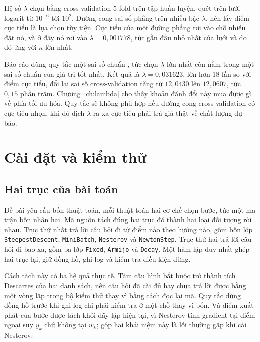 \documentclass[12pt, a4paper, oneside]{report}
\theoremstyle{definition}
\begin{document}
Hệ số $\lambda$ chọn bằng cross-validation $5$ fold trên tập huấn luyện, quét trên
lưới logarit từ $10^{-6}$ tới $10^{2}$. Đường cong sai số phẳng trên nhiều bậc
$\lambda$, nên lấy điểm cực tiểu là lựa chọn tùy tiện. Cực tiểu của một đường phẳng rơi vào
chỗ nhiễu đặt nó, và ở đây nó rơi vào $\lambda = 0{,}001778$, tức
gần đầu nhỏ nhất của lưới và do đó ứng với $\kappa$ lớn nhất.

Báo cáo dùng quy tắc một sai số chuẩn \cite{hastie2009elements}, tức chọn
$\lambda$ lớn nhất còn nằm trong một sai số chuẩn của giá trị tốt nhất. Kết quả
là $\lambda = 0{,}031623$, lớn hơn 18 lần so với điểm cực tiểu, đổi lại sai số
cross-validation tăng từ $12{,}0430$ lên $12{,}0607$, tức $0{,}15$ phần trăm.
Chương~\ref{ch:lambda} cho thấy khoản đánh đổi này mua được gì về phía tối ưu
hóa. Quy tắc sẽ không phù hợp nếu đường cong cross-validation có cực tiểu nhọn,
khi đó dịch $\lambda$ ra xa cực tiểu phải trả giá thật về chất lượng dự báo.

\chapter{Cài đặt và kiểm thử}

\section{Hai trục của bài toán}

Đề bài yêu cầu bốn thuật toán, mỗi thuật toán hai cơ chế chọn bước, tức một ma
trận bốn nhân hai. Mã nguồn tách đúng hai trục đó thành hai loại đối tượng rời
nhau. Trục thứ nhất trả lời câu hỏi đi từ điểm nào theo hướng nào, gồm bốn lớp
\texttt{SteepestDescent}, \texttt{MiniBatch}, \texttt{Nesterov} và
\texttt{NewtonStep}. Trục thứ hai trả lời câu hỏi đi bao xa, gồm ba lớp
\texttt{Fixed}, \texttt{Armijo} và \texttt{Decay}. Một hàm lặp duy nhất ghép hai
trục lại, giữ đồng hồ, ghi log và kiểm tra điều kiện dừng.

Cách tách này có ba hệ quả thực tế. Tám cấu hình bắt buộc trở thành tích Descartes
của hai danh sách, nên câu hỏi đã cài đủ hay chưa trả lời được bằng một vòng lặp
trong bộ kiểm thử thay vì bằng cách đọc lại mã. Quy tắc dừng đồng hồ trước khi
ghi log chỉ phải kiểm tra ở một chỗ thay vì bốn. Và điểm xuất phát của bước được
tách khỏi dãy lặp hiện tại, vì Nesterov tính gradient tại điểm ngoại suy $y_k$
chứ không tại $w_k$; gộp hai khái niệm này là lỗi thường gặp khi cài Nesterov.
\end{document}
